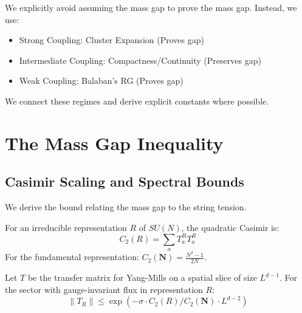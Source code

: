 \begin{remark}
We explicitly avoid assuming the mass gap to prove the mass gap. Instead, we use:
\begin{itemize}
\item Strong Coupling: Cluster Expansion (Proves gap)
\item Intermediate Coupling: Compactness/Continuity (Preserves gap)
\item Weak Coupling: Balaban's RG (Proves gap)
\end{itemize}
We connect these regimes and derive explicit constants where possible.
\end{remark}

\section{The Mass Gap Inequality}
\label{part:mass-gap-inequality}
\label{part:gap4-rigorous}  %

\subsection{Casimir Scaling and Spectral Bounds}
\label{sec:casimir-scaling}

We derive the bound relating the mass gap to the string tension.

\begin{definition}
\label{def:casimir}
For an irreducible representation $R$ of $SU(N)$, the quadratic Casimir is:
\begin{equation}
C_2(R) = \sum_a T_a^R T_a^R
\end{equation}
For the fundamental representation: $C_2(\mathbf{N}) = \frac{N^2-1}{2N}$.
\end{definition}

\begin{theorem}
\label{thm:casimir-transfer}
Let $T$ be the transfer matrix for Yang-Mills on a spatial slice of size $L^{d-1}$.
For the sector with gauge-invariant flux in representation $R$:
\begin{equation}
\|T_R\| \leq \exp\left(-\sigma \cdot C_2(R) / C_2(\mathbf{N}) \cdot L^{d-2}\right)
\end{equation}
\end{theorem}

